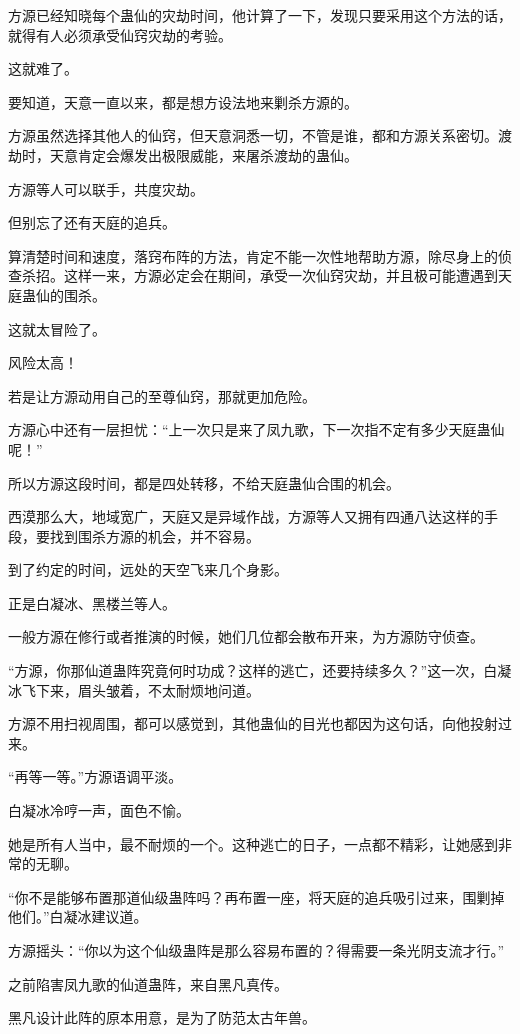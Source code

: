 \begin{this_body}
方源已经知晓每个蛊仙的灾劫时间，他计算了一下，发现只要采用这个方法的话，就得有人必须承受仙窍灾劫的考验。

这就难了。

要知道，天意一直以来，都是想方设法地来剿杀方源的。

方源虽然选择其他人的仙窍，但天意洞悉一切，不管是谁，都和方源关系密切。渡劫时，天意肯定会爆发出极限威能，来屠杀渡劫的蛊仙。

方源等人可以联手，共度灾劫。

但别忘了还有天庭的追兵。

算清楚时间和速度，落窍布阵的方法，肯定不能一次性地帮助方源，除尽身上的侦查杀招。这样一来，方源必定会在期间，承受一次仙窍灾劫，并且极可能遭遇到天庭蛊仙的围杀。

这就太冒险了。

风险太高！

若是让方源动用自己的至尊仙窍，那就更加危险。

方源心中还有一层担忧：“上一次只是来了凤九歌，下一次指不定有多少天庭蛊仙呢！”

所以方源这段时间，都是四处转移，不给天庭蛊仙合围的机会。

西漠那么大，地域宽广，天庭又是异域作战，方源等人又拥有四通八达这样的手段，要找到围杀方源的机会，并不容易。

到了约定的时间，远处的天空飞来几个身影。

正是白凝冰、黑楼兰等人。

一般方源在修行或者推演的时候，她们几位都会散布开来，为方源防守侦查。

“方源，你那仙道蛊阵究竟何时功成？这样的逃亡，还要持续多久？”这一次，白凝冰飞下来，眉头皱着，不太耐烦地问道。

方源不用扫视周围，都可以感觉到，其他蛊仙的目光也都因为这句话，向他投射过来。

“再等一等。”方源语调平淡。

白凝冰冷哼一声，面色不愉。

她是所有人当中，最不耐烦的一个。这种逃亡的日子，一点都不精彩，让她感到非常的无聊。

“你不是能够布置那道仙级蛊阵吗？再布置一座，将天庭的追兵吸引过来，围剿掉他们。”白凝冰建议道。

方源摇头：“你以为这个仙级蛊阵是那么容易布置的？得需要一条光阴支流才行。”

之前陷害凤九歌的仙道蛊阵，来自黑凡真传。

黑凡设计此阵的原本用意，是为了防范太古年兽。


\end{this_body}
